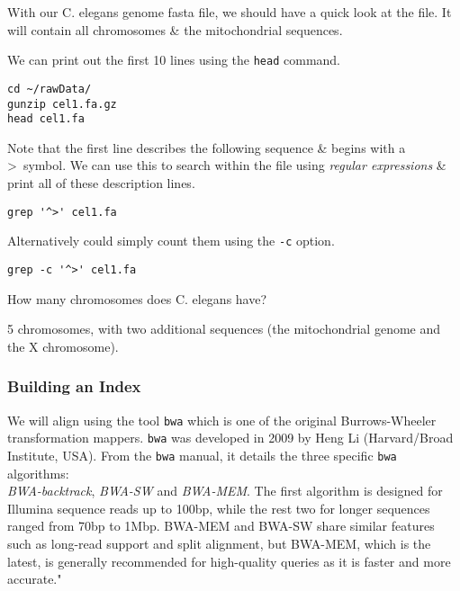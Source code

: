 \begin{information}
With our C. elegans genome fasta file, we should have a quick look at the file.
It will contain all chromosomes \& the mitochondrial sequences.
\end{information}

\begin{steps}
We can print out the first 10 lines using the \texttt{head} command.
\begin{lstlisting}
cd ~/rawData/
gunzip cel1.fa.gz
head cel1.fa
\end{lstlisting}
Note that the first line describes the following sequence \& begins with a \textgreater ~symbol.
We can use this to search within the file using \textit{regular expressions} \& print all of these description lines.
\begin{lstlisting}
grep '^>' cel1.fa
\end{lstlisting}
Alternatively could simply count them using the \texttt{-c} option.
\begin{lstlisting}
grep -c '^>' cel1.fa
\end{lstlisting}
\end{steps}

\begin{questions}
How many chromosomes does C. elegans have?\\
\begin{answer}
5 chromosomes, with two additional sequences (the mitochondrial genome and the X chromosome).
\end{answer}
\end{questions}

\subsubsection{Building an Index}
We will align using the tool \texttt{bwa} which is one of the original Burrows-Wheeler transformation mappers.
\texttt{bwa} was developed in 2009 by Heng Li (Harvard/Broad Institute, USA).
From the \texttt{bwa} manual, it details the three specific \texttt{bwa} algorithms: \\
\textit{BWA-backtrack}, \textit{BWA-SW} and \textit{BWA-MEM}. The first algorithm is designed for Illumina  sequence  reads up to 100bp, while the rest two for longer sequences ranged from 70bp to 1Mbp. BWA-MEM and BWA-SW share similar features such as long-read support and split alignment, but BWA-MEM, which is the latest, is generally recommended for high-quality queries as it  is  faster  and  more accurate."  \\

